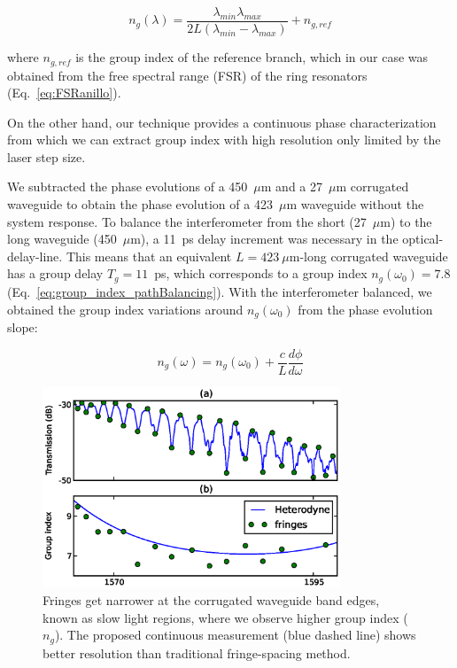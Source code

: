 \documentclass[journal]{IEEEtran}
\begin{document}
\begin{equation}
  n_g (\lambda)=\frac{\lambda_{min} \lambda_{max}}{ 2L (\lambda_{min} - \lambda_{max})} + n_{g,ref}
\end{equation}


where $n_{g,ref}$ is the group index of the reference branch, which in our case was obtained from the free spectral range (FSR) of the ring resonators (Eq.~\ref{eq:FSRanillo}).  %


On the other hand, our technique provides a continuous phase characterization from which we can extract group index with high resolution only limited by the laser step size.

 
We subtracted the phase evolutions of a 450~$\mu$m and a 27~$\mu$m corrugated waveguide to obtain the phase evolution of a 423~$\mu$m waveguide without the system response.
To balance the interferometer from the short (27~$\mu$m) to the long waveguide (450~$\mu$m), a 11~ps delay increment was necessary in the optical-delay-line.
This means that an equivalent $L=423~\mu$m-long corrugated waveguide has a group delay $T_g=11$~ps, which corresponds to a group index $n_g(\omega_0)=7.8$ (Eq.~\ref{eq:group_index_pathBalancing}).
With the interferometer balanced, we obtained the group index variations around $n_g(\omega_0)$ from the phase evolution slope: %

\begin{equation}
  n_g (\omega)=  n_g(\omega_0) + \frac{c}{L} \frac{d\phi}{d\omega}
 \label{eq:groupIndexEvolution}
\end{equation}



\begin{figure}[htb]
  \centering
  \includegraphics[width=3.5in]{gropIndexComparison_2}
  \caption{Fringes get narrower at the corrugated waveguide band edges, known as slow light regions, where we observe higher group index ($n_g$).
  The proposed continuous measurement (blue dashed line) shows better resolution than traditional fringe-spacing method.}
  \label{fig:groupIndex}
\end{figure}
\end{document}
